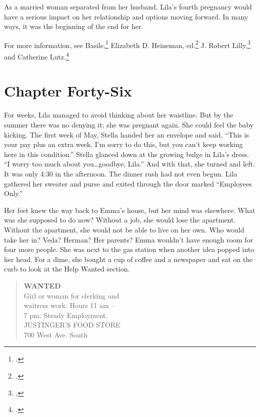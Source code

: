\documentclass[
  american,
  letterpaper,
]{book}
\begin{document}
As a married woman separated from her husband, Lila's fourth pregnancy
would have a serious impact on her relationship and options moving
forward. In many ways, it was the beginning of the end for her.

For more information, see Basile,\footnote{.} Elizabeth D. Heineman,
ed.\footnote{.} J. Robert
Lilly,\footnote{.} and Catherine Lutz.\footnote{.}


\chapter{Chapter Forty-Six}\label{chapter-forty-six}

For weeks, Lila managed to avoid thinking about her waistline. But by
the summer there was no denying it; she was pregnant again. She could
feel the baby kicking. The first week of May, Stella handed her an
envelope and said, ``This is your pay plus an extra week. I'm sorry to
do this, but you can't keep working here in this condition.'' Stella
glanced down at the growing bulge in Lila's dress. ``I worry too much
about you\ldots goodbye, Lila.'' And with that, she turned and left. It
was only 4:30 in the afternoon. The dinner rush had not even begun. Lila
gathered her sweater and purse and exited through the door marked
``Employees Only.''

Her feet knew the way back to Emma's house, but her mind was elsewhere.
What was she supposed to do now? Without a job, she would lose the
apartment. Without the apartment, she would not be able to live on her
own. Who would take her in? Veda? Herman? Her parents? Emma wouldn't
have enough room for four more people. She was next to the gas station
when another idea popped into her head. For a dime, she bought a cup of
coffee and a newspaper and sat on the curb to look at the Help Wanted
section.

\begin{quote}
\textbf{WANTED}\\
Girl or woman for clerking and\\
waitress work. Hours 11 am --\\
7 pm. Steady Employment.\\
JUSTINGER'S FOOD STORE\\
700 West Ave. South
\end{quote}
\end{document}

